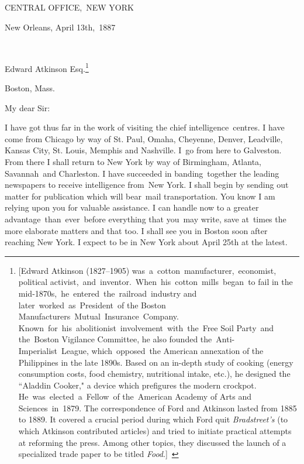 \documentclass[openany,nobib]{tufte-book}
\begin{document}
\vspace{.1in}

\noindent CENTRAL OFFICE,~NEW YORK~~~~~~~

\vspace{.15in}

\hfill New Orleans, April 13th,~1887

~

\noindent Edward Atkinson Esq.\footnote{{[}Edward Atkinson (1827--1905)
  was~a~cotton~manufacturer,~economist, political
  activist,~and~inventor.~When~his~cotton~mills~began~to fail in the
  mid-1870s,~he~entered~the~railroad~industry and
  later~worked~as~President~of the Boston
  Manufacturers~Mutual~Insurance~Company.
  Known~for~his~abolitionist~involvement~with~the~Free Soil Party~and
  the~Boston Vigilance Committee, he also founded
  the~Anti-Imperialist~League, which~opposed~the American annexation of
  the Philippines in the late 1890s. Based on an in-depth study of
  cooking (energy consumption costs, food chemistry, nutritional intake,
  etc.), he designed the ``Aladdin Cooker," a device which prefigures
  the modern crockpot. He~was~elected~a~Fellow~of the~American Academy
  of Arts and Sciences~in~1879. The correspondence of Ford and Atkinson
  lasted from 1885 to 1889. It covered a crucial period during which
  Ford quit \emph{Bradstreet's} (to which Atkinson contributed articles)
  and tried to initiate practical attempts at reforming the press. Among
  other topics, they discussed the launch of a specialized trade paper
  to be titled \emph{Food}.{]}~}

\hspace{.15in} Boston, Mass.~

\vspace{.1in}

\noindent My dear Sir:~~

\vspace{.1in}

I have got thus far in the work of visiting the chief
intelligence~centres. I have come from Chicago by way of St. Paul,
Omaha, Cheyenne, Denver, Leadville, Kansas City, St. Louis, Memphis and
Nashville. I~go from here to Galveston. From there I shall return to New
York by way of Birmingham, Atlanta, Savannah~and Charleston. I have
succeeded in banding~together the leading newspapers to receive
intelligence from~New York. I shall begin by sending out matter for
publication which will bear~mail transportation. You know I am relying
upon you for valuable assistance. I can handle now to a greater
advantage~than~ever~before everything that you~may write, save at~times
the more elaborate matters and that too. I shall see you in Boston soon
after reaching New York. I expect to be in New York about April 25th at
the latest.~
\end{document}

